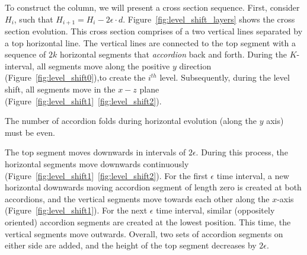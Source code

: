 %

To construct the column, we will present a cross section sequence.
First, consider $H_i$, such that $H_{i+1} = H_i-2\epsilon\cdot d$.
Figure~\ref{fig:level_shift_layers} shows the cross section evolution.
This cross section comprises of a two vertical lines separated by a top horizontal line.
The vertical lines are connected to the top segment with
a sequence of $2k$ horizontal segments that \emph{accordion} back and forth.
During the $K$-interval, all segments move along the positive $y$ direction (Figure~\ref{fig:level_shift0}),to create the $i^{th}$ level.
Subsequently, during the level shift, all segments move in the $x-z$ plane (Figure~\ref{fig:level_shift1}~\ref{fig:level_shift2}).
\begin{lemma}
\label{lem:accordion_even}
The number of accordion folds during horizontal evolution (along the $y$ axis) must be even.
\end{lemma}


The top segment moves downwards in intervals of $2\epsilon$.
During this process, the horizontal segments move downwards continuously (Figure~\ref{fig:level_shift1}~\ref{fig:level_shift2}).
For the first $\epsilon$ time interval, a new horizontal downwards moving accordion segment of length zero is created at both accordions,
and the vertical segments move towards each other along the $x$-axis (Figure~\ref{fig:level_shift1}).
For the next $\epsilon$ time interval, similar (oppositely oriented) accordion segments are created at the lowest position.
This time, the vertical segments move outwards.
Overall, two sets of accordion segments on either side are added, and the height of the top segment decreases by $2\epsilon$.

